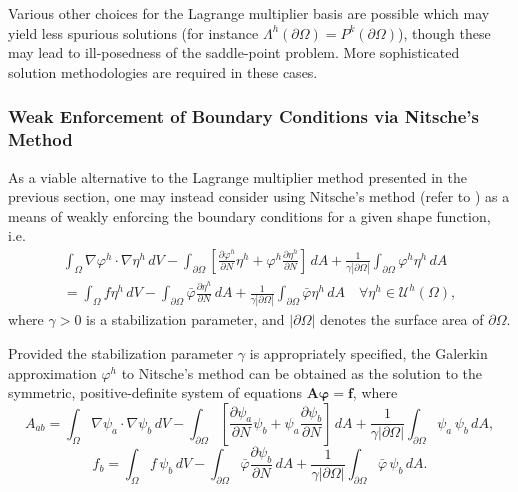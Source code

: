 	Various other choices for the Lagrange multiplier basis are possible which may yield less spurious solutions (for instance $\Lambda^h (\partial \Omega) = P^{k} (\partial \Omega)$), though these may lead to ill-posedness of the saddle-point problem. More sophisticated solution methodologies are required in these cases.

	\subsubsection*{Weak Enforcement of Boundary Conditions via Nitsche's Method}
	
	As a viable alternative to the Lagrange multiplier method presented in the previous section, one may instead consider using Nitsche's method (refer to \cite{Juntunen&Stenberg:09}) as a means of weakly enforcing the boundary conditions for a given shape function, i.e.
	\begin{eqnarray}
		\int_{\Omega} \nabla \varphi^h \cdot \nabla \eta^h \, dV - \int_{\partial \Omega} \left[ \frac{\partial \varphi^h}{\partial N} \eta^h + \varphi^h \frac{\partial \eta^h}{\partial N} \right] \, dA + \frac{1}{\gamma |\partial \Omega|} \int_{\partial \Omega} \varphi^h \eta^h \, dA \nonumber \\ = \int_\Omega f \eta^h \, dV - \int_{\partial \Omega} \bar{\varphi} \frac{\partial \eta^h}{\partial N} \, dA + \frac{1}{\gamma |\partial \Omega|} \int_{\partial \Omega} \bar{\varphi} \eta^h \, dA \quad \forall \eta^h \in \mathcal{U}^h (\Omega),
	\end{eqnarray}
	where $\gamma > 0$ is a stabilization parameter, and $| \partial \Omega |$ denotes the surface area of $\partial \Omega$.
	
	Provided the stabilization parameter $\gamma$ is appropriately specified, the Galerkin approximation $\varphi^h$ to Nitsche's method can be obtained as the solution to the symmetric, positive-definite system of equations $\mathbf{A} \boldsymbol{\varphi} = \mathbf{f}$, where
	\begin{equation}
		A_{ab} = \int_{\Omega} \nabla \psi_a \cdot \nabla \psi_b \, dV - \int_{\partial \Omega} \left[ \frac{\partial \psi_a}{\partial N} \psi_b + \psi_a \frac{\partial \psi_b}{\partial N} \right] \, dA + \frac{1}{\gamma |\partial \Omega|} \int_{\partial \Omega} \psi_a \, \psi_b \, dA,
	\end{equation}
	\begin{equation}
		f_{b} = \int_{\Omega} f \, \psi_b \, dV - \int_{\partial \Omega} \bar{\varphi} \frac{\partial \psi_b}{\partial N} \, dA + \frac{1}{\gamma |\partial \Omega|} \int_{\partial \Omega} \bar{\varphi} \, \psi_b \, dA.
	\end{equation}
	
